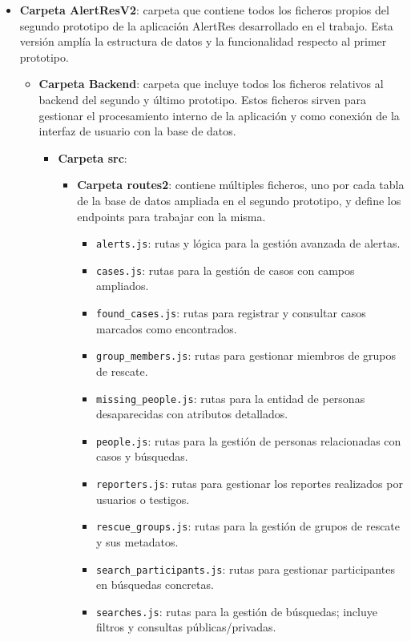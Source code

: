 \begin{itemize}
    \item \textbf{Carpeta AlertResV2}: carpeta que contiene todos los ficheros propios del segundo prototipo de la aplicación AlertRes desarrollado en el trabajo. Esta versión amplía la estructura de datos y la funcionalidad respecto al primer prototipo.
    \begin{itemize}
        \item \textbf{Carpeta Backend}: carpeta que incluye todos los ficheros relativos al backend del segundo y último prototipo. Estos ficheros sirven para gestionar el procesamiento interno de la aplicación y como conexión de la interfaz de usuario con la base de datos.
        \begin{itemize}
            \item \textbf{Carpeta src}:
            \begin{itemize}
                \item \textbf{Carpeta routes2}: contiene múltiples ficheros, uno por cada tabla de la base de datos ampliada en el segundo prototipo, y define los endpoints para trabajar con la misma.
                \begin{itemize}
                    \item \texttt{alerts.js}: rutas y lógica para la gestión avanzada de alertas.
                    \item \texttt{cases.js}: rutas para la gestión de casos con campos ampliados.
                    \item \texttt{found\_cases.js}: rutas para registrar y consultar casos marcados como encontrados.
                    \item \texttt{group\_members.js}: rutas para gestionar miembros de grupos de rescate.
                    \item \texttt{missing\_people.js}: rutas para la entidad de personas desaparecidas con atributos detallados.
                    \item \texttt{people.js}: rutas para la gestión de personas relacionadas con casos y búsquedas.
                    \item \texttt{reporters.js}: rutas para gestionar los reportes realizados por usuarios o testigos.
                    \item \texttt{rescue\_groups.js}: rutas para la gestión de grupos de rescate y sus metadatos.
                    \item \texttt{search\_participants.js}: rutas para gestionar participantes en búsquedas concretas.
                    \item \texttt{searches.js}: rutas para la gestión de búsquedas; incluye filtros y consultas públicas/privadas.

\end{itemize}
\end{itemize}
\end{itemize}
\end{itemize}
\end{itemize}
